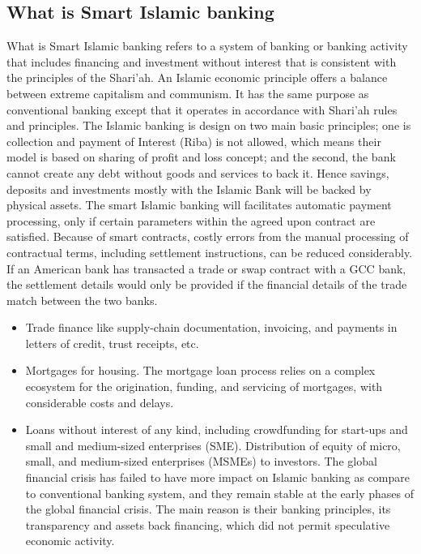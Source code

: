 \documentclass[a4paper,11pt]{article}
\begin{document}
\subsection{What is Smart Islamic banking}

What is Smart Islamic banking refers to a system of banking or banking activity that includes financing and investment without interest that is consistent with the principles of the Shari’ah. An Islamic economic principle offers a balance between extreme capitalism and communism. It has the same purpose as conventional banking except that it operates in accordance with Shari’ah rules and principles. The Islamic banking is design on two main basic principles; one is collection and payment of Interest (Riba) is not allowed, which means their model is based on sharing of profit and loss concept; and the second, the bank cannot create any debt without goods and services to back it. Hence savings, deposits and investments mostly with the Islamic Bank will be backed by physical assets.
The smart Islamic banking will facilitates automatic payment processing, only if certain parameters within the agreed upon contract are satisfied. Because of smart contracts, costly errors from the manual processing of contractual terms, including settlement instructions, can be reduced considerably. If an American bank has transacted a trade or swap contract with a GCC bank, the settlement details would only be provided if the financial details of the trade match between the two banks. 

\begin{itemize}
    \item Trade finance like supply-chain documentation, invoicing, and payments in letters of credit, trust receipts, etc. 
    \item Mortgages for housing. The mortgage loan process relies on a complex ecosystem for the origination, funding, and servicing of mortgages, with considerable costs and delays. 
    \item Loans without interest of any kind, including crowdfunding for start-ups and small and medium-sized enterprises (SME). Distribution of equity of micro, small, and medium-sized enterprises (MSMEs) to investors.
The global financial crisis has failed to have more impact on Islamic banking as compare to conventional banking system, and they remain stable at the early phases of the global financial crisis. The main reason is their banking principles, its transparency and assets back financing, which did not permit speculative economic activity.
\end{itemize}
\end{document}
